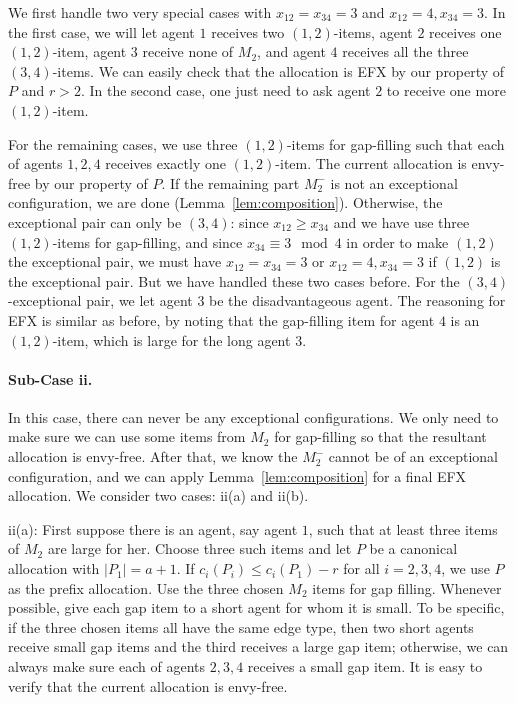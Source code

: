 \documentclass{article}
\theoremstyle{definition}
\begin{document}
We first handle two very special cases with $x_{12}=x_{34}=3$ and $x_{12}=4,x_{34}=3$.
In the first case, we will let agent $1$ receives two $(1,2)$-items, agent $2$ receives one $(1,2)$-item, agent $3$ receive none of $M_2$, and agent $4$ receives all the three $(3,4)$-items.
We can easily check that the allocation is EFX by our property of $P$ and $r>2$.
In the second case, one just need to ask agent $2$ to receive one more $(1,2)$-item.

For the remaining cases, we use three $(1,2)$-items for gap-filling such that each of agents $1,2,4$ receives exactly one $(1,2)$-item.
The current allocation is envy-free by our property of $P$.
If the remaining part $M_2^-$ is not an exceptional configuration, we are done (Lemma~\ref{lem:composition}).
Otherwise, the exceptional pair can only be $(3,4)$: since $x_{12}\geq x_{34}$ and we have use three $(1,2)$-items for gap-filling, and since $x_{34}\equiv 3\mod 4$ in order to make $(1,2)$ the exceptional pair, we must have $x_{12}=x_{34}=3$ or $x_{12}=4,x_{34}=3$ if $(1,2)$ is the exceptional pair. But we have handled these two cases before.
For the $(3,4)$-exceptional pair, we let agent $3$ be the disadvantageous agent.
The reasoning for EFX is similar as before, by noting that the gap-filling item for agent $4$ is an $(1,2)$-item, which is large for the long agent $3$.

\paragraph{Sub-Case ii.}
In this case, there can never be any exceptional configurations.
We only need to make sure we can use some items from $M_2$ for gap-filling so that the resultant allocation is envy-free.
After that, we know the $M_2^-$ cannot be of an exceptional configuration, and we can apply Lemma~\ref{lem:composition} for a final EFX allocation.
We consider two cases: ii(a) and ii(b).

ii(a): First suppose there is an agent, say agent $1$, such that at least three items of $M_2$ are large for her. 
Choose three such items and let $P$ be a canonical allocation with $|P_1|=a+1$.
If $c_i(P_i)\leq c_i(P_1)-r$ for all $i=2,3,4$, we use $P$ as the prefix allocation.  
Use the three chosen $M_2$ items for gap filling.  
Whenever possible, give each gap item to a short agent for whom it is small.  
To be specific, if the three chosen items all have the same edge type, then two
short agents receive small gap items and the third receives a large gap item; otherwise, we can always make sure each of agents $2,3,4$ receives a small gap item.
It is easy to verify that the current allocation is envy-free.
\end{document}
